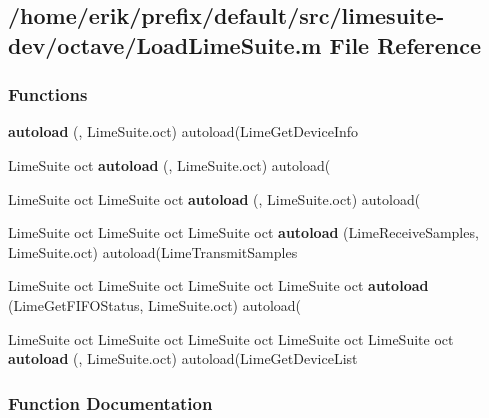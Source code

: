 \subsection{/home/erik/prefix/default/src/limesuite-\/dev/octave/\+Load\+Lime\+Suite.m File Reference}
\label{LoadLimeSuite_8m}
\subsubsection*{Functions}
\begin{DoxyCompactItemize}
\item 
{\bf autoload} (\textquotesingle{}, \textquotesingle{}Lime\+Suite.\+oct\textquotesingle{}) autoload(\textquotesingle{}Lime\+Get\+Device\+Info\textquotesingle{}
\item 
Lime\+Suite oct {\bf autoload} (\textquotesingle{}, \textquotesingle{}Lime\+Suite.\+oct\textquotesingle{}) autoload(\textquotesingle{}
\item 
Lime\+Suite oct Lime\+Suite oct {\bf autoload} (\textquotesingle{}, \textquotesingle{}Lime\+Suite.\+oct\textquotesingle{}) autoload(\textquotesingle{}
\item 
Lime\+Suite oct Lime\+Suite oct Lime\+Suite oct {\bf autoload} (\textquotesingle{}Lime\+Receive\+Samples\textquotesingle{}, \textquotesingle{}Lime\+Suite.\+oct\textquotesingle{}) autoload(\textquotesingle{}Lime\+Transmit\+Samples\textquotesingle{}
\item 
Lime\+Suite oct Lime\+Suite oct Lime\+Suite oct Lime\+Suite oct {\bf autoload} (\textquotesingle{}Lime\+Get\+F\+I\+F\+O\+Status\textquotesingle{}, \textquotesingle{}Lime\+Suite.\+oct\textquotesingle{}) autoload(\textquotesingle{}
\item 
Lime\+Suite oct Lime\+Suite oct Lime\+Suite oct Lime\+Suite oct Lime\+Suite oct {\bf autoload} (\textquotesingle{}, \textquotesingle{}Lime\+Suite.\+oct\textquotesingle{}) autoload(\textquotesingle{}Lime\+Get\+Device\+List\textquotesingle{}
\end{DoxyCompactItemize}


\subsubsection{Function Documentation}
